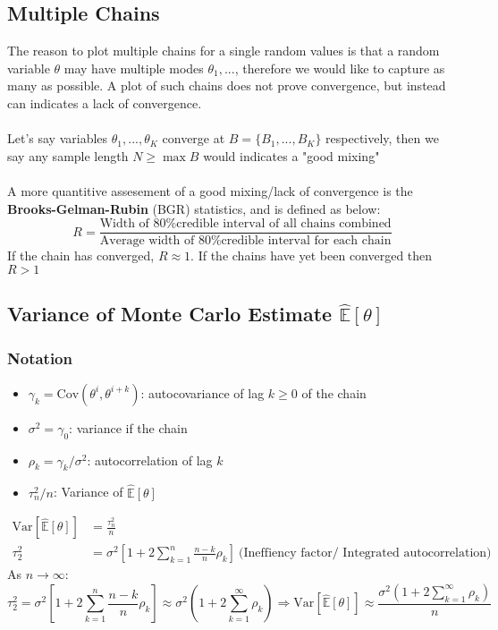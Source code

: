 \documentclass[12pt]{article}
\theoremstyle{definition}
\newcommand{\Var}[1]{\text{Var}\left[#1\right]}
\newcommand{\Cov}[1]{\text{Cov}\left(#1\right)}
\newcommand{\MonteCarlo}[1]{\hat{\mathbb{E}}\left[#1\right]}
\begin{document}
    \subsection*{Multiple Chains}
    The reason to plot multiple chains for a single random values is that a random variable $\theta$ may have multiple modes $\theta_1,...$, therefore we would like to capture as many as possible. A plot of such chains does not prove convergence, but instead can indicates a lack of convergence.
    \\~\\Let's say variables $\theta_1,...,\theta_K$ converge at $B = \{B_1,...,B_K\}$ respectively, then we say any sample length $N \geq \max B$ would indicates a "good mixing"
    \\~\\A more quantitive assesement of a good mixing/lack of convergence is the \textbf{Brooks-Gelman-Rubin} (BGR) statistics, and is defined as below:
    $$R = \frac{\text{Width of 80\% credible interval of all chains combined}}{\text{Average width of 80\% credible interval for each chain}}$$
    If the chain has converged, $R \approx 1$. If the chains have yet been converged then $R > 1$
    \subsection*{Variance of Monte Carlo Estimate $\MonteCarlo{\theta}$}
        \subsubsection*{Notation}
        \begin{itemize}
            \item $\gamma_k = \Cov{\theta^i,\theta^{i+k}}$: autocovariance of lag $k \geq 0$ of the chain
            \item $\sigma^2 = \gamma_0$: variance if the chain
            \item $\rho_k = \gamma_k / \sigma^2$: autocorrelation of lag $k$
            \item $\tau_n^2/n$: Variance of $\MonteCarlo{\theta}$
        \end{itemize}
        \begin{align*}
            \Var{\MonteCarlo{\theta}} &= \frac{\tau_n^2}{n}\\\tau_2^2 &= \sigma^2 \left[1 + 2 \sum_{k=1}^n \frac{n-k}{n}\rho_k\right]\ \text{(Ineffiency factor/ Integrated autocorrelation)}
        \end{align*}
        As $n \rightarrow \infty$:
        $$\tau_2^2 = \sigma^2 \left[1 + 2 \sum_{k=1}^n \frac{n-k}{n}\rho_k\right] \approx \sigma^2 \left(1 + 2 \sum_{k=1}^\infty \rho_k\right) \Rightarrow \Var{\MonteCarlo{\theta}} \approx \frac{\sigma^2 \left(1 + 2 \sum_{k=1}^\infty \rho_k\right)}{n}$$
        \newpage
\end{document}
